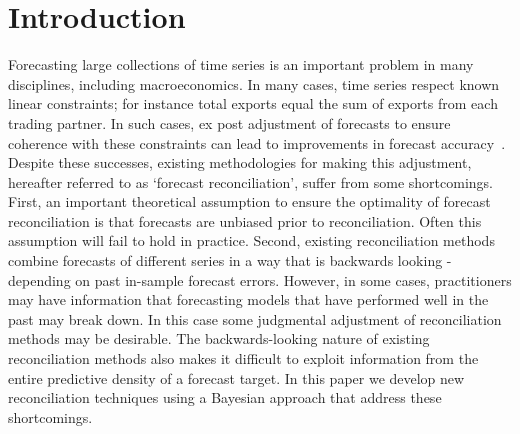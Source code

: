 \documentclass[a4paper,fleqn,11pt]{article}
\begin{document}
			




\section{Introduction}
\label{sec:intro}
Forecasting large collections of time series is an important problem in many disciplines, including macroeconomics.  In many cases, time series respect known linear constraints; for instance total exports equal the sum of exports from each trading partner. In such cases, ex post adjustment of forecasts to ensure coherence with these constraints can lead to improvements in forecast accuracy~\citep[see][and references therein]{Wickramasuriya2015}. Despite these successes, existing methodologies for making this adjustment, hereafter referred to as `forecast reconciliation', suffer from some shortcomings.  First, an important theoretical assumption to ensure the optimality of forecast reconciliation is that forecasts are unbiased prior to reconciliation.  Often this assumption will fail to hold in practice.  Second, existing reconciliation methods combine forecasts of different series in a way that is backwards looking - depending on past in-sample forecast errors.  However, in some cases, practitioners may have information that forecasting models that have performed well in the past may break down. In this case some judgmental adjustment of reconciliation methods may be desirable.  The backwards-looking nature of existing reconciliation methods also makes it difficult to exploit information from the entire predictive density of a forecast target.  In this paper we develop new reconciliation techniques using a Bayesian approach that address these shortcomings.
\end{document}
